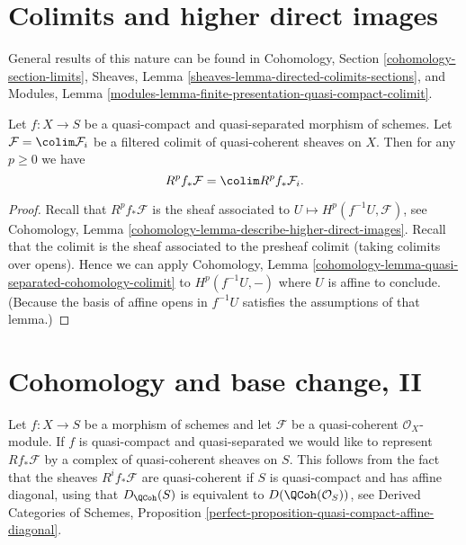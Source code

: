 \section{Colimits and higher direct images}
\label{section-colimits}

\noindent
General results of this nature can be found in
Cohomology, Section \ref{cohomology-section-limits},
Sheaves, Lemma \ref{sheaves-lemma-directed-colimits-sections}, and
Modules, Lemma \ref{modules-lemma-finite-presentation-quasi-compact-colimit}.

\begin{lemma}
\label{lemma-colimit-cohomology}
Let $f : X \to S$ be a quasi-compact and quasi-separated morphism of schemes.
Let $\mathcal{F} = \colim \mathcal{F}_i$ be a filtered colimit
of quasi-coherent sheaves on $X$.
Then for any $p \geq 0$ we have
$$
R^pf_*\mathcal{F} = \colim R^pf_*\mathcal{F}_i.
$$
\end{lemma}

\begin{proof}
Recall that $R^pf_*\mathcal{F}$ is the sheaf associated to
$U \mapsto H^p(f^{-1}U, \mathcal{F})$, see
Cohomology, Lemma \ref{cohomology-lemma-describe-higher-direct-images}.
Recall that the colimit is the sheaf associated to the presheaf colimit
(taking colimits over opens). Hence we can apply
Cohomology, Lemma \ref{cohomology-lemma-quasi-separated-cohomology-colimit}
to $H^p(f^{-1}U, -)$ where $U$ is affine to conclude. (Because the
basis of affine opens in $f^{-1}U$ satisfies the assumptions of that
lemma.)
\end{proof}










\section{Cohomology and base change, II}
\label{section-cohomology-and-base-change-derived}

\noindent
Let $f : X \to S$ be a morphism of schemes and let $\mathcal{F}$
be a quasi-coherent $\mathcal{O}_X$-module. If $f$ is quasi-compact
and quasi-separated we would like to represent $Rf_*\mathcal{F}$
by a complex of quasi-coherent sheaves on $S$. This follows
from the fact that the sheaves $R^if_*\mathcal{F}$ are quasi-coherent
if $S$ is quasi-compact and has affine diagonal,
using that $D_\QCoh(S)$ is equivalent to
$D(\QCoh(\mathcal{O}_S))$, see
Derived Categories of Schemes, Proposition
\ref{perfect-proposition-quasi-compact-affine-diagonal}.

